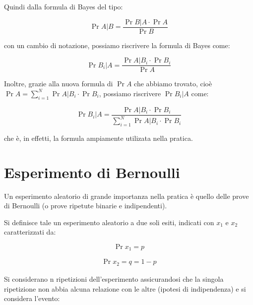 Quindi dalla formula di Bayes del tipo: 

{
    \Large 
    \begin{equation}
        \Pr{A | B} = \frac{\Pr{B | A} \cdot \Pr{A}}{\Pr{B}}
    \end{equation}
}

con un cambio di notazione, possiamo riscrivere la formula di Bayes come: 

{
    \Large 
    \begin{equation}
        \Pr{B_i | A} = \frac{\Pr{A | B_i} \cdot \Pr{B_i}}{\Pr{A}}
    \end{equation}
}

Inoltre, grazie alla nuova formula di $\Pr{A}$ che abbiamo trovato, cioè 
$\Pr{A} = \sum_{i = 1}^{N} \Pr{A | B_i} \cdot \Pr{B_i}$, possiamo riscrivere $\Pr{B_i | A}$ come: 

{
    \Large 
    \begin{equation}
        \Pr{B_i | A} = \frac{\Pr{A | B_i} \cdot \Pr{B_i}}{\sum_{i = 1}^{N} \Pr{A | B_i} \cdot \Pr{B_i}}  
    \end{equation}
}

che è, in effetti, la formula ampiamente utilizata nella pratica. \newline 

\newpage 

\section{Esperimento di Bernoulli} 

Un esperimento aleatorio di grande importanza nella pratica è quello delle prove di Bernoulli (o prove ripetute binarie e indipendenti). \newline 

Si definisce tale un esperimento aleatorio a due soli esiti, indicati con $x_1$ e $x_2$ caratterizzati da: 

{
    \Large 
    \begin{equation}
        \Pr{x_1} = p
    \end{equation}
}

{
    \Large 
    \begin{equation}
        \begin{split}
            \Pr{x_2} = q = 1 - p    
        \end{split}
    \end{equation}
}

Si considerano n ripetizioni dell'esperimento assicurandosi che la singola ripetizione non abbia alcuna relazione con le altre (ipotesi di indipendenza) 
e si considera l'evento: 

